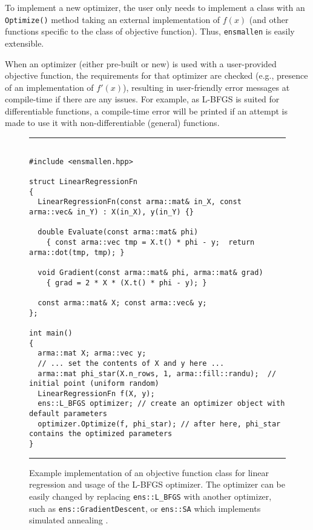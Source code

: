 \documentclass[twoside,11pt]{article}
\begin{document}
To implement a new optimizer, the user only needs to implement a class with an
{\tt Optimize()} method taking an external implementation of $f(x)$ (and other
functions specific to the class of objective function).  Thus, {\tt ensmallen}
is easily extensible.

When an optimizer (either pre-built or new) is used with a user-provided objective function,
the requirements for that optimizer are checked
(e.g., presence of an implementation of $f'(x)$),
resulting in user-friendly error messages at compile-time
if there are any issues.
For example, as L-BFGS is suited for differentiable functions,
a compile-time error will be printed if an attempt is made
to use it with non-differentiable (general) functions.

\begin{figure}[t!]
\hrule
\vspace{1ex}
\centering
\begin{verbatim}

#include <ensmallen.hpp>

struct LinearRegressionFn
{
  LinearRegressionFn(const arma::mat& in_X, const arma::vec& in_Y) : X(in_X), y(in_Y) {}

  double Evaluate(const arma::mat& phi)
    { const arma::vec tmp = X.t() * phi - y;  return arma::dot(tmp, tmp); }
  
  void Gradient(const arma::mat& phi, arma::mat& grad)
    { grad = 2 * X * (X.t() * phi - y); }

  const arma::mat& X; const arma::vec& y;
};

int main() 
{
  arma::mat X; arma::vec y;
  // ... set the contents of X and y here ...
  arma::mat phi_star(X.n_rows, 1, arma::fill::randu);  // initial point (uniform random)
  LinearRegressionFn f(X, y);
  ens::L_BFGS optimizer; // create an optimizer object with default parameters
  optimizer.Optimize(f, phi_star); // after here, phi_star contains the optimized parameters
}
\end{verbatim}
\hrule
\vspace*{-0.5em}
\caption{Example implementation of an objective function class for linear
regression and usage of the L-BFGS optimizer.
The optimizer can be easily changed by replacing
{\tt ens::L\_BFGS} with another optimizer,
such as {\tt ens::GradientDescent},
or {\tt ens::SA} which implements simulated annealing \citep{kirkpatrick1983optimization}.
}
\label{fig:lr_function}
\vspace*{-2em}
\end{figure}
\end{document}
